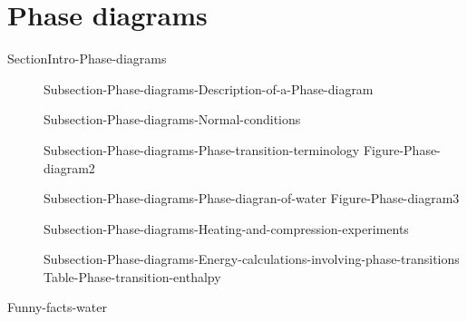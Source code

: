 \documentclass[main.tex]{subfiles}
\begin{document}
\section{Phase diagrams}{SectionIntro-Phase-diagrams}
\sloppy \begin{description}
\item[] {Subsection-Phase-diagrams-Description-of-a-Phase-diagram}
\item[] {Subsection-Phase-diagrams-Normal-conditions}
\item[] {Subsection-Phase-diagrams-Phase-transition-terminology}
{Figure-Phase-diagram2}
\item[] {Subsection-Phase-diagrams-Phase-diagran-of-water}
{Figure-Phase-diagram3}

\item[] {Subsection-Phase-diagrams-Heating-and-compression-experiments}
\item[] {Subsection-Phase-diagrams-Energy-calculations-involving-phase-transitions}
 {Table-Phase-transition-enthalpy}
\end{description}







 {Funny-facts-water}


\checkoddpage\ifoddpage \clearpage\thispagestyle{empty}\mbox{}\clearpage \else  \fi 
\end{document}
